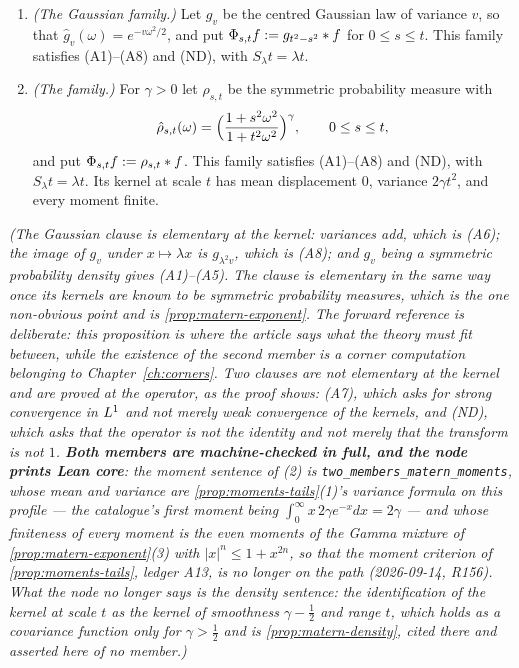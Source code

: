 \begin{proposition}\label{prop:two-members}
\leanok
{}
\begin{enumerate}
\item \emph{(The Gaussian family.)} Let $g_v$ be the centred Gaussian law of variance $v$, so
that $\hat g_v(\omega) = e^{-v\omega^2/2}$, and put $\Phi_{s,t}f := g_{t^2-s^2} * f$ for
$0 \le s \le t$. This family satisfies (A1)--(A8) and (ND), with $S_\lambda t = \lambda t$.
\item \emph{(The \Matern{} family.)} For $\gamma > 0$ let $\rho_{s,t}$ be the symmetric
probability measure with
\[
  \hat\rho_{s,t}(\omega) = \Bigl(\frac{1 + s^2\omega^2}{1 + t^2\omega^2}\Bigr)^{\gamma},
  \qquad 0 \le s \le t,
\]
and put $\Phi_{s,t}f := \rho_{s,t} * f$. This family satisfies (A1)--(A8) and (ND), with
$S_\lambda t = \lambda t$. Its kernel at scale $t$ has mean displacement $0$, variance
$2\gamma t^2$, and every moment finite.
\end{enumerate}
\statusT\quad\emph{(The Gaussian clause is elementary at the kernel: variances add, which is
(A6); the image of $g_v$ under $x \mapsto \lambda x$ is $g_{\lambda^2v}$, which is (A8); and
$g_v$ being a symmetric probability density gives (A1)--(A5). The \Matern{} clause is elementary
in the same way once its kernels are known to be symmetric probability measures, which is the
one non-obvious point and is \ref{prop:matern-exponent}. The forward reference is deliberate:
this proposition is where the article says what the theory must fit between, while the existence
of the second member is a corner computation belonging to Chapter~\ref{ch:corners}. Two clauses
are not elementary at the kernel and are proved at the operator, as the proof shows: (A7), which
asks for strong convergence in $L^1$ and not merely weak convergence of the kernels, and (ND),
which asks that the operator is not the identity and not merely that the transform is not $1$.
\textbf{Both members are machine-checked in full, and the node prints Lean core}: the moment
sentence of (2) is \texttt{two\_members\_matern\_moments}, whose mean and variance are
\ref{prop:moments-tails}(1)'s variance formula on this profile --- the catalogue's first moment
being $\int_0^\infty x\,2\gamma e^{-x}dx = 2\gamma$ --- and whose finiteness of every moment is
the even moments of the Gamma mixture of \ref{prop:matern-exponent}(3) with
$|x|^n \le 1 + x^{2n}$, so that the moment criterion of \ref{prop:moments-tails}, ledger A13, is
no longer on the path (2026-09-14, R156). What the node no longer says is the \emph{density}
sentence: the identification of the kernel at scale $t$ as the \Matern{} kernel of smoothness
$\gamma - \tfrac12$ and range $t$, which holds as a covariance function only for
$\gamma > \tfrac12$ and is \ref{prop:matern-density}, cited there and asserted here of no
member.)}
\end{proposition}

